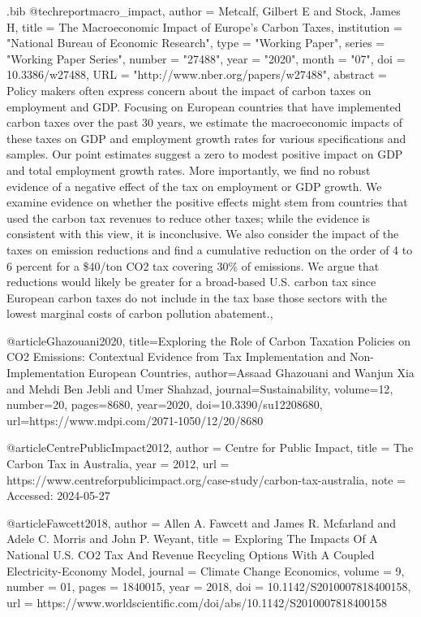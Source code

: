 \begin{filecontents}{.bib}
@techreport{macro_impact,
 author = {{Metcalf, Gilbert E and Stock, James H}},
 title = {{The Macroeconomic Impact of Europe’s Carbon Taxes}},
 institution = "National Bureau of Economic Research",
 type = "Working Paper",
 series = "Working Paper Series",
 number = "27488",
 year = "2020",
 month = "07",
 doi = {10.3386/w27488},
 URL = "http://www.nber.org/papers/w27488",
 abstract = {Policy makers often express concern about the impact of carbon taxes on employment and GDP. Focusing on European countries that have implemented carbon taxes over the past 30 years, we estimate the macroeconomic impacts of these taxes on GDP and employment growth rates for various specifications and samples.  Our point estimates suggest a zero to modest positive impact on GDP and total employment growth rates.  More importantly, we find no robust evidence of a negative effect of the tax on employment or GDP growth.  We examine evidence on whether the positive effects might stem from countries that used the carbon tax revenues to reduce other taxes; while the evidence is consistent with this view, it is inconclusive. We also consider the impact of the taxes on emission reductions and find a cumulative reduction on the order of 4 to 6 percent for a \$40/ton CO2 tax covering 30\% of emissions.  We argue that reductions would likely be greater for a broad-based U.S. carbon tax since European carbon taxes do not include in the tax base those sectors with the lowest marginal costs of carbon pollution abatement.},
}


@article{Ghazouani2020,
  title={Exploring the Role of Carbon Taxation Policies on CO2 Emissions: Contextual Evidence from Tax Implementation and Non-Implementation European Countries},
  author={{Assaad Ghazouani and Wanjun Xia and Mehdi Ben Jebli and Umer Shahzad}},
  journal={Sustainability},
  volume={12},
  number={20},
  pages={8680},
  year={2020},
  doi={10.3390/su12208680},
  url={https://www.mdpi.com/2071-1050/12/20/8680}
}


@article{CentrePublicImpact2012,
  author = {{Centre for Public Impact}},
  title = {The Carbon Tax in Australia},
  year = {2012},
  url = 
  {https://www.centreforpublicimpact.org/case-study/carbon-tax-australia},
  note = {Accessed: 2024-05-27}
}

@article{Fawcett2018,
  author = {{Allen A. Fawcett and James R. Mcfarland and Adele C. Morris and John P. Weyant}},
  title = {Exploring The Impacts Of A National U.S. CO2 Tax And Revenue Recycling Options With A Coupled Electricity-Economy Model},
  journal = {Climate Change Economics},
  volume = {9},
  number = {01},
  pages = {1840015},
  year = {2018},
  doi = {10.1142/S2010007818400158},
  url = {https://www.worldscientific.com/doi/abs/10.1142/S2010007818400158}
}



\end{filecontents}
